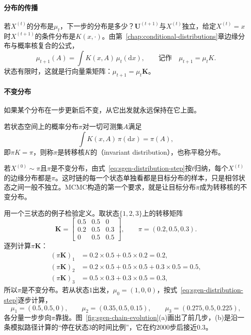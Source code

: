 \paragraph{分布的传播}
若$X^{(t)}$的分布是$\mu_t$，下一步的分布是多少？$\bm{U}^{(t+1)}$与$X^{(t)}$独立，给定$X^{(t)}=x$时$X^{(t+1)}$的条件分布是$K(x,\cdot)$。由第~\ref{chap:conditional-distributions}章边缘分布与概率核复合的公式，
\begin{equation}
  \mu_{t+1}(A)=\int K(x,A)\,\mu_t(\mathrm{d}x),\qquad\text{记作}\quad\mu_{t+1}=\mu_tK .
  \label{eq:sgen-distribution-step}
\end{equation}
状态有限时，这就是行向量乘矩阵：$\mu_{t+1}=\mu_t\bm{K}$。

\paragraph{不变分布}
如果某个分布在一步更新后不变，从它出发就永远保持在它上面。

\begin{definition}[不变分布]
\label{def:sgen-invariant}
若状态空间上的概率分布$\pi$对一切可测集$A$满足
\begin{equation}
  \int K(x,A)\,\pi(\mathrm{d}x)=\pi(A),
  \label{eq:sgen-invariance}
\end{equation}
即$\pi K=\pi$，则称$\pi$是转移核$K$的（invariant distribution），也称平稳分布。
\end{definition}

若$X^{(0)}\sim\pi$且$\pi$是不变分布，由式~\eqref{eq:sgen-distribution-step}按$t$归纳，每个$X^{(t)}$的边缘分布都是$\pi$。这时链的每一个状态单独看都是目标分布的样本，只是相邻状态之间一般不独立。MCMC构造的第一个要求，就是让目标分布$\pi$成为转移核的不变分布。

用一个三状态的例子检验定义。取状态$\{1,2,3\}$上的转移矩阵
\[
  \bm{K}=\begin{bmatrix}0.5&0.5&0\\0.2&0.5&0.3\\0&0.5&0.5\end{bmatrix},\qquad \pi=(0.2,0.5,0.3).
\]
逐列计算$\pi\bm{K}$：
\[
  \begin{aligned}
    (\pi\bm{K})_1&=0.2\times0.5+0.5\times0.2=0.2,\\
    (\pi\bm{K})_2&=0.2\times0.5+0.5\times0.5+0.3\times0.5=0.5,\\
    (\pi\bm{K})_3&=0.5\times0.3+0.3\times0.5=0.3,
  \end{aligned}
\]
所以$\pi$是不变分布。若从状态$1$出发，$\mu_0=(1,0,0)$，按式~\eqref{eq:sgen-distribution-step}逐步计算，
\[
  \mu_1=(0.5,0.5,0),\qquad \mu_2=(0.35,0.5,0.15),\qquad \mu_3=(0.275,0.5,0.225),
\]
各分量一步步向$\pi$靠拢。图~\ref{fig:sgen-chain-evolution}(a)画出了前几步，(b)是沿一条模拟路径计算的“停在状态$3$的时间比例”，它在约$2000$步后接近$0.3$。

